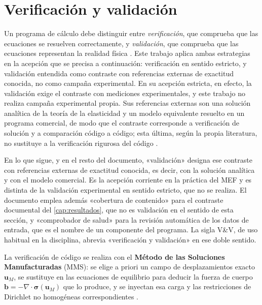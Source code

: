 \section{Verificación y validación}
\label{sec:verificacion-validacion}

Un programa de cálculo debe distinguir entre \emph{verificación}, que comprueba que las ecuaciones se resuelven correctamente, y \emph{validación}, que comprueba que las ecuaciones representan la realidad física \autocite[pp.~13-14]{oberkampf2010vv}. Este trabajo aplica ambas estrategias en la acepción que se precisa a continuación: verificación en sentido estricto, y validación entendida como contraste con referencias externas de exactitud conocida, no como campaña experimental. En su acepción estricta, en efecto, la validación exige el contraste con mediciones experimentales, y este trabajo no realiza campaña experimental propia. Sus referencias externas son una solución analítica de la teoría de la elasticidad y un modelo equivalente resuelto en un programa comercial, de modo que el contraste corresponde a verificación de solución y a comparación código a código; esta última, según la propia literatura, no sustituye a la verificación rigurosa del código \autocite[pp.~173-174]{oberkampf2010vv}.

En lo que sigue, y en el resto del documento, «validación» designa ese contraste con referencias externas de exactitud conocida, es decir, con la solución analítica y con el modelo comercial. Es la acepción corriente en la práctica del MEF y es distinta de la validación experimental en sentido estricto, que no se realiza. El documento emplea además «cobertura de contenido» para el contraste documental del \autoref{cap:resultados}, que no es validación en el sentido de esta sección, y «comprobador de salud» para la revisión automática de los datos de entrada, que es el nombre de un componente del programa. La sigla V\&V, de uso habitual en la disciplina, abrevia «verificación y validación» en ese doble sentido.

La verificación de código se realiza con el \textbf{Método de las Soluciones Manufacturadas} (MMS): se elige a priori un campo de desplazamientos exacto $\bm{u}_M$, se sustituye en las ecuaciones de equilibrio para deducir la fuerza de cuerpo $\bm{b} = -\nabla\cdot\bm{\sigma}(\bm{u}_M)$ que lo produce, y se inyectan esa carga y las restricciones de Dirichlet no homogéneas correspondientes \autocites[pp.~21, 26]{salari2000mms}[pp.~219-222]{oberkampf2010vv}.


